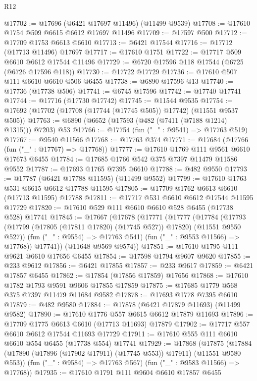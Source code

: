 \begin{lexlean}{R12}
\begin{coremodule}
{{{{{{{{{{{{{{{{{{{{{{{{{{{{{{{{{{{{{{{{{{{{{{{{{{{{{{{{{{{{{{{{{{{{{{{{{{{{{{{{{{@17702 := @17696 (@6421 @17697 @11496) (@11499 @9539)
@17708 := @17610 @1754 @509 @6615 @6612 @17697 @11496
@17709 := @17597 @500
@17712 := @17709 @1753 @6613 @6610
@17713 := @6421 @17544
@17716 := @17712 (@17713 @11496) @17697
@17717 := @17610 @1751
@17722 := @17717 @509 @6610 @6612 @17544 @11496
@17729 := @6720 @17596 @118 @17544 (@6725 (@6726 @17596 @118))
@17730 := @17722 @17729
@17736 := @17610 @507 @111 @6610 @6610 @506 @6455
@17738 := @6890 @17596 @13
@17740 := @17736 (@17738 @506)
@17741 := @6745 @17596
@17742 := @17740 @17741
@17744 := @17716 (@17730 @17742)
@17745 := @11544 @9535
@17754 := @17692 (@17702 (@17708 (@17744 (@17745 @505)) @17742) (@11551 @9537 @505))
@17763 := @6890 (@6652 (@17593 (@482 (@7411 (@7188 @1214) @1315))) @7203) @53
@17766 := @17754 (fun ("_" : @9541) => @17763 @519)
@17767 := @9540 @11566
@17768 := @17763 @374
@17771 := @17684 (@17766 (fun ("_" : @17767) => @17768))
@17777 := @17610 @1769 @111 @9561 @6610 @17673 @6455
@17784 := @17685 @1766 @542 @375 @7397 @11479 @11586 @9552
@17787 := @17693 @1765 @7395 @6610
@17788 := @482 @9550
@17793 := @17787 (@6421 @17788 @11595) (@11499 @9552)
@17799 := @17610 @1763 @531 @6615 @6612 @17788 @11595
@17805 := @17709 @1762 @6613 @6610 (@17713 @11595) @17788
@17811 := @17717 @531 @6610 @6612 @17544 @11595 @17729
@17820 := @17610 @529 @111 @6610 @6610 @528 @6455 (@17738 @528) @17741
@17845 := @17667
    (@17678
      (@17771
        (@17777
          (@17784
            (@17793 (@17799 (@17805 (@17811 @17820) (@17745 @527)) @17820) (@11551 @9550 @527))
            (fun ("_" : @9554) => @17763 @541)
            (fun ("_" : @9553 @11566) => @17768))
          @17741))
      (@11648 @9569 @9574))
@17851 := @17610 @1795 @111 @9621 @6610 @17656 @6455
@17854 := @17598 @1794 @9607 @9620
@17855 := @233 @9612
@17856 := @6421 @17855
@17857 := @233 @9617
@17859 := @6421 @17857 @6455
@17862 := @17854 (@17856 @17859) @17656
@17868 := @17610 @1782 @1793 @9591 @9606 @17855 @17859
@17875 := @17685 @1779 @568 @375 @7397 @11479 @11684 @9582
@17878 := @17693 @1778 @7395 @6610
@17879 := @482 @9580
@17884 := @17878 (@6421 @17879 @11693) (@11499 @9582)
@17890 := @17610 @1776 @557 @6615 @6612 @17879 @11693
@17896 := @17709 @1775 @6613 @6610 (@17713 @11693) @17879
@17902 := @17717 @557 @6610 @6612 @17544 @11693 @17729
@17911 := @17610 @555 @111 @6610 @6610 @554 @6455 (@17738 @554) @17741
@17929 := @17868
    (@17875
      (@17884 (@17890 (@17896 (@17902 @17911) (@17745 @553)) @17911) (@11551 @9580 @553))
      (fun ("_" : @9584) => @17763 @567)
      (fun ("_" : @9583 @11566) => @17768))
@17935 := @17610 @1791 @111 @9604 @6610 @17857 @6455
}}}}}}}}}}}}}}}}}}}}}}}}}}}}}}}}}}}}}}}}}}}}}}}}}}}}}}}}}}}}}}}}}}}}}}}}}}}}}}}}}}
\end{coremodule}
\end{lexlean}
